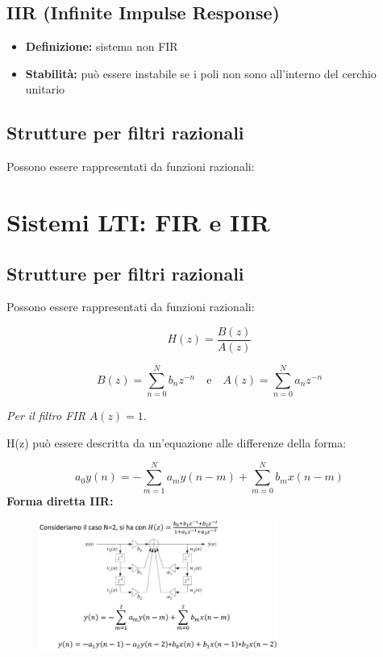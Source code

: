 \subsection*{IIR (Infinite Impulse Response)}

\begin{itemize}
    \item \textbf{Definizione:} sistema non FIR
    \item \textbf{Stabilità:} può essere instabile se i poli non sono all'interno del cerchio unitario
\end{itemize}

\subsection*{Strutture per filtri razionali}

Possono essere rappresentati da funzioni razionali:
\section{Sistemi LTI: FIR e IIR}

\subsection*{Strutture per filtri razionali}

Possono essere rappresentati da funzioni razionali:

\[
H(z) = \frac{B(z)}{A(z)}
\]

\[
B(z) = \sum_{n=0}^{N} b_n z^{-n} \quad \text{e} \quad A(z) = \sum_{n=0}^{N} a_n z^{-n}
\]

\textit{Per il filtro FIR} \( A(z) = 1 \).

H(z) può essere descritta da un'equazione alle differenze della forma:

\[
a_0 y(n) = - \sum_{m=1}^{N} a_m y(n-m) + \sum_{m=0}^{N} b_m x(n-m)
\]
\textbf{Forma diretta IIR:}
\begin{figure}[H]
    \centering
    \includegraphics[width=0.7\textwidth]{capitoli/capitolo4/immagini/image1.png}
\end{figure}

